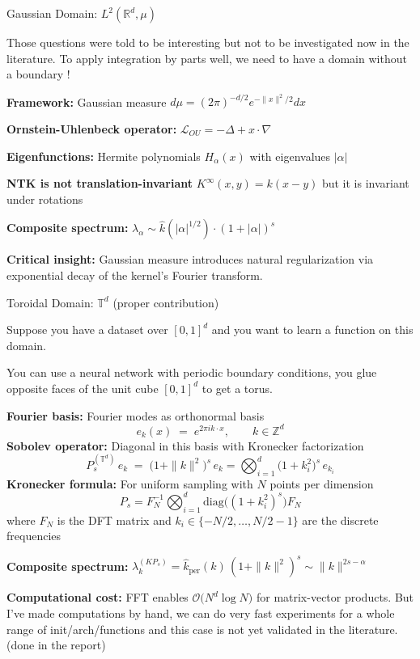 \documentclass{beamer}
\begin{document}
\begin{frame}{Gaussian Domain: $L^2(\mathbb{R}^d, \mu)$}

  
Those questions were told to be interesting but not to be investigated now in the literature.
To apply integration by parts well, we need to have a domain without a boundary !

\textbf{Framework:} Gaussian measure $d\mu = (2\pi)^{-d/2} e^{-\|x\|^2/2} dx$

\textbf{Ornstein-Uhlenbeck operator:} $\mathcal{L}_{OU} = -\Delta + x \cdot \nabla$

\textbf{Eigenfunctions:} Hermite polynomials $H_{\alpha}(x)$ with eigenvalues $|\alpha|$

\textbf{NTK is not translation-invariant} $K^{\infty}(x, y) = k(x - y)$ but it is invariant under rotations

\textbf{Composite spectrum:} $\lambda_\alpha \sim \hat{k}(|\alpha|^{1/2}) \cdot (1 + |\alpha|)^s$

\textbf{Critical insight:} Gaussian measure introduces natural regularization via exponential decay of the kernel's Fourier transform.
\end{frame}



\begin{frame}{Toroidal Domain: $\mathbb{T}^d$ (proper contribution)}

  Suppose you have a dataset over $[0,1]^d$ and you want to learn a function on this domain.

  You can use a neural network with periodic boundary conditions, you glue opposite faces of the unit cube $[0,1]^d$ to get a torus.

\textbf{Fourier basis:} Fourier modes as orthonormal basis
\[
   e_k(x) \;=\; e^{2\pi i k\cdot x}, \qquad k\in\mathbb Z^d
\]
\textbf{Sobolev operator:} Diagonal in this basis with Kronecker factorization
\[
   P_s^{(\mathbb{T}^d)}\,e_k\;=\;\bigl(1+\|k\|^2\bigr)^{s}\,e_k = \bigotimes_{i=1}^d \bigl(1+k_i^2\bigr)^{s}\,e_{k_i}
\]
\textbf{Kronecker formula:} For uniform sampling with $N$ points per dimension
\[
P_s = F_N^{-1} \bigotimes_{i=1}^d \text{diag}\bigl((1+k_i^2)^s\bigr) F_N
\]
where $F_N$ is the DFT matrix and $k_i \in \{-N/2,\ldots,N/2-1\}$ are the discrete frequencies

\textbf{Composite spectrum:} $\lambda_k^{(KP_s)} = \widehat{k}_{\text{per}}(k)\,(1+\|k\|^2)^{s} \sim \|k\|^{2s-\alpha}$

\textbf{Computational cost:} FFT enables $\mathcal O\bigl(N^d\log N\bigr)$ for matrix-vector products.
But I've made computations by hand, we can do very fast experiments for a whole range of init/arch/functions and this case is not yet validated in the literature.
(done in the report)
\end{frame}
\end{document}
